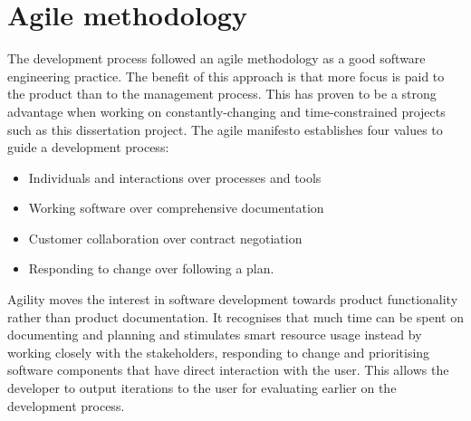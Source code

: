 \section{Agile methodology}
The development process followed an agile methodology as a good software engineering practice. The benefit of this approach is that more focus is paid to the product than to the management process. This has proven to be a strong advantage when working on constantly-changing and time-constrained projects such as this dissertation project.
The agile manifesto \cite{Martin2002} establishes four values to guide a development process: 
\begin{displayquote}
\begin{itemize}
  \item Individuals and interactions over processes and tools
  \item Working software over comprehensive documentation
  \item Customer collaboration over contract negotiation
  \item Responding to change over following a plan. 
\end{itemize}
\end{displayquote}

Agility moves the interest in software development towards product functionality rather than product documentation. It recognises that much time can be spent on documenting and planning and stimulates smart resource usage instead by working closely with the stakeholders, responding to change and prioritising software components that have direct interaction with the user. This allows the developer to output iterations to the user for evaluating earlier on the development process.

\iffalse
\subsection{Self-management}
Versioning software was used to manage the workflow of the different components of the system, the repositories are available online in a public GitHub repository. Links
\fi